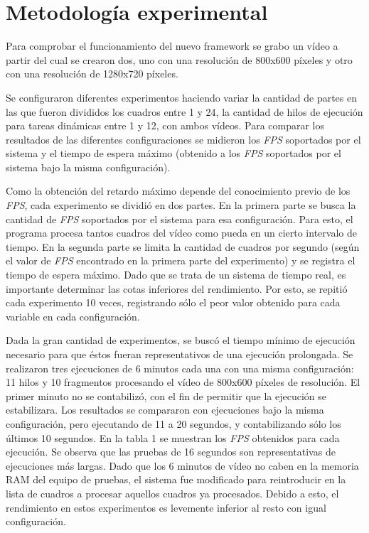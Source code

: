 
\section{Metodología experimental}

Para comprobar el funcionamiento del nuevo framework se grabo un vídeo a partir
del cual se crearon dos, uno con una resolución de 800x600 píxeles y otro con
una resolución de 1280x720 píxeles.

Se configuraron diferentes experimentos haciendo variar la cantidad de partes en
las que fueron divididos los cuadros entre 1 y 24, la cantidad de hilos de
ejecución para tareas dinámicas entre 1 y 12, con ambos vídeos. Para comparar
los resultados de las diferentes configuraciones se midieron los \emph{FPS}
soportados por el sistema y el tiempo de espera máximo (obtenido a los
\emph{FPS} soportados por el sistema bajo la misma configuración).

Como la obtención del retardo máximo depende del conocimiento previo de los
\emph{FPS}, cada experimento se dividió en dos partes. En la primera parte se
busca la cantidad de \emph{FPS} soportados por el sistema para esa
configuración. Para esto, el programa procesa tantos cuadros del vídeo como
pueda en un cierto intervalo de tiempo. En la segunda parte se limita la
cantidad de cuadros por segundo (según el valor de \emph{FPS} encontrado en la
primera parte del experimento) y se registra el tiempo de espera máximo. Dado
que se trata de un sistema de tiempo real, es importante determinar las cotas
inferiores del rendimiento. Por esto, se repitió cada experimento 10 veces,
registrando sólo el peor valor obtenido para cada variable en cada
configuración.

Dada la gran cantidad de experimentos, se buscó el tiempo mínimo de ejecución
necesario para que éstos fueran representativos de una ejecución prolongada. Se
realizaron tres ejecuciones de 6 minutos cada una con una misma configuración:
11 hilos y 10 fragmentos procesando el vídeo de 800x600 píxeles de resolución.
El primer minuto no se contabilizó, con el fin de permitir que la ejecución se
estabilizara. Los resultados se compararon con ejecuciones bajo la misma
configuración, pero ejecutando de 11 a 20 segundos, y contabilizando sólo los
últimos 10 segundos. En la tabla 1 se muestran los \emph{FPS} obtenidos para
cada ejecución. Se observa que las pruebas de 16 segundos son representativas de
ejecuciones más largas. Dado que los 6 minutos de vídeo no caben en la memoria
RAM del equipo de pruebas, el sistema fue modificado para reintroducir en la
lista de cuadros a procesar aquellos cuadros ya procesados. Debido a esto, el
rendimiento en estos experimentos es levemente inferior al resto con igual
configuración.

